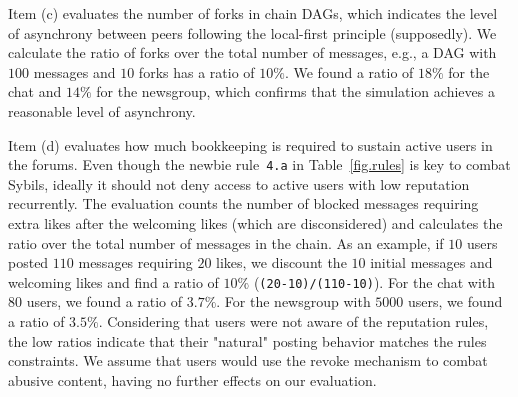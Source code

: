 \documentclass[10pt,journal,compsoc]{IEEEtran}
\newcommand{\code}[1]  {\texttt{\footnotesize{#1}}}
\begin{document}
Item (c) evaluates the number of forks in chain DAGs, which indicates the level
of asynchrony between peers following the local-first principle (supposedly).
We calculate the ratio of forks over the total number of messages, e.g., a DAG
with $100$ messages and $10$ forks has a ratio of $10\%$.
We found a ratio of $18\%$ for the chat and $14\%$ for the newsgroup, which
confirms that the simulation achieves a reasonable level of asynchrony.

Item (d) evaluates how much bookkeeping is required to sustain active users in
the forums.
Even though the newbie rule~\code{4.a} in Table~\ref{fig.rules} is key to
combat Sybils, ideally it should not deny access to active users with low
reputation recurrently.
%
The evaluation counts the number of blocked messages requiring extra likes
after the welcoming likes (which are disconsidered) and calculates the ratio
over the total number of messages in the chain.
As an example, if $10$ users posted $110$ messages requiring $20$ likes, we
discount the $10$ initial messages and welcoming likes and find a ratio of
$10\%$ (\code{(20-10)/(110-10)}).
%
For the chat with $80$ users, we found a ratio of $3.7\%$.
For the newsgroup with $5000$ users, we found a ratio of $3.5\%$.
%
Considering that users were not aware of the reputation rules, the low ratios
indicate that their "natural" posting behavior matches the rules constraints.
%
We assume that users would use the revoke mechanism to combat abusive content,
having no further effects on our evaluation.
\end{document}
